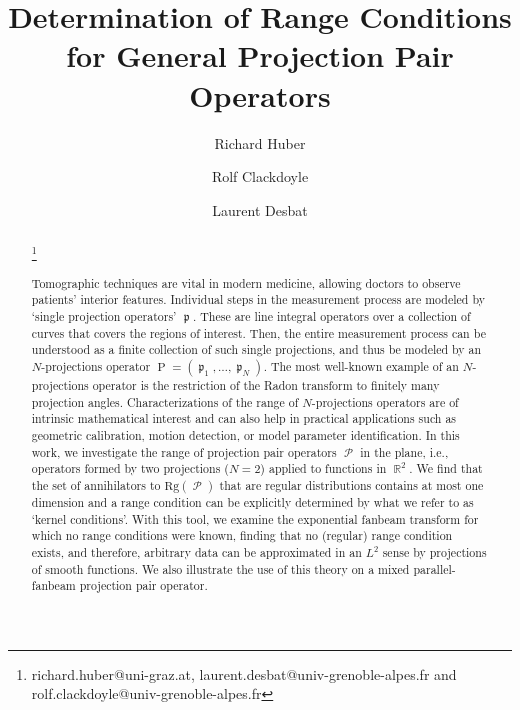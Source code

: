 \documentclass[12pt]{article}
\DeclareMathOperator{\RR}{{\mathbb{R}}}
\DeclareMathOperator{\Proj}{\mathcal{P}}
\DeclareMathOperator{\Projind}{\mathfrak{p}}
\DeclareMathOperator{\Projbasic}{P}
\newcommand{\rg}[1]{\mathrm{Rg}({#1})}
\begin{document}
\newcommand\blfootnote[1]{%
\begingroup
\renewcommand\thefootnote{}\footnote{#1}%
\addtocounter{footnote}{-1}%
\endgroup
}

\title{Determination of Range Conditions for General Projection Pair Operators}
\author[1]{Richard Huber}    \author[2]{Rolf Clackdoyle} \author[2]{Laurent Desbat}

\date{}
\maketitle

\begin{abstract}
\blfootnote{richard.huber@uni-graz.at, laurent.desbat@univ-grenoble-alpes.fr and rolf.clackdoyle@univ-grenoble-alpes.fr}
Tomographic techniques are vital in modern medicine, allowing doctors to observe patients’ interior features. Individual steps in the measurement process are modeled by `single projection operators' $\Projind$. These are line integral operators over a collection of curves that covers the regions of interest. 
Then, the entire measurement process can be understood as a finite collection of such single projections, and thus be modeled by an $N$-projections operator $\Projbasic=(\Projind_1,\dots,\Projind_N)$.  The most well-known example of an $N$-projections operator is the restriction of the Radon transform to finitely many projection angles. 
Characterizations of the range of $N$-projections operators are of intrinsic mathematical interest and can also help in practical applications such as geometric calibration, motion detection, or model parameter identification. 
In this work, we investigate the range of projection pair operators $\Proj$ in the plane, i.e., operators formed by two projections ($N=2$) applied to functions in $\RR^2$.
We find that the  set of annihilators to $\rg{\Proj}$ that are regular distributions contains at most one dimension
and a range condition can be explicitly determined by what we refer to as  `kernel conditions'.
With this tool, we examine the exponential fanbeam transform for which no range conditions were known, finding that no (regular) range condition exists, and therefore, arbitrary data can be approximated in an $L^2$ sense by projections of smooth functions.
We also illustrate the use of this theory on a mixed parallel-fanbeam projection pair operator. 
\end{abstract}
\end{document}
